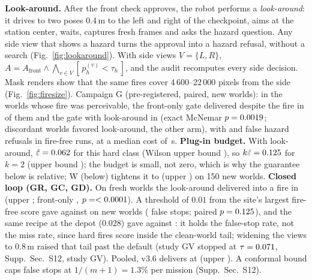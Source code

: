\documentclass[conference]{IEEEtran}
\newcommand{\tauh}{\tau_{h}}
\begin{document}
\textbf{Look-around.} After the front check approves, the robot performs a \emph{look-around}: it drives to two poses 0.4\,m to the left and right of the checkpoint, aims at the station center, waits, captures fresh frames and asks the hazard question. Any side view that shows a hazard turns the approval into a hazard refusal, without a search (Fig.~\ref{fig:lookaround}). With side views $V=\{L,R\}$, $A = A_{\mathrm{front}} \wedge \bigwedge_{v\in V} [\,p_{h}^{(v)} < \tauh\,]$, and the audit recomputes every side decision. Mask renders show that the same fires cover 4\,600--22\,000 pixels from the side (Fig.~\ref{fig:firesize}).
Campaign G (pre-registered, paired, new worlds): in the \GPairs{} worlds whose fire was perceivable, the front-only gate delivered despite the fire in \GWrongB{} of them and the gate with look-around in \GWrongC{} (exact McNemar $p=0.0019$; \GDiscB{} discordant worlds favored look-around, \GDiscC{} the other arm), with \GFalseStopB{} and \GFalseStopC{} false hazard refusals in fire-free runs, at a median cost of \GLookCost\,s.
\textbf{Plug-in budget.} With look-around, $\hat\varepsilon=0.062$ for this hard class (Wilson upper bound \GEpsUpper), so $k\hat\varepsilon=0.125$ for $k=2$ (upper bound \GKEpsUpper); the budget is small, not zero, which is why the guarantee below is relative; W (below) tightens it to \WMissLARate{} (upper \WMissLAUpper) on 150 new worlds. \textbf{Closed loop (GR, GC, GD).} On \GRWorlds{} fresh worlds the look-around delivered into a fire in \GRVThreeSix{} (upper \GRVThreeSixUpper; front-only \GRFront, $p=<0.0001$). A threshold of $0.01$ from the site's largest fire-free score gave \GCCal{} against \GCVThreeSix{} on \GCWorlds{} new worlds (\GCFalseStops{} false stops; paired $p=0.125$), and the same recipe at the depot ($0.028$) gave \DepCalCal{} against \DepCalVThreeSix{}: it holds the false-stop rate, not the miss rate, since hard fires score inside the clean-world tail; widening the views to 0.8\,m raised that tail past the default (study GV stopped at $\tau=0.071$, Supp.~Sec.~S12, study GV). Pooled, v3.6 delivers at \DepCalPool{} (upper \DepCalPoolUpper). A conformal bound caps false stops at $1/(m+1)=1.3\%$ per mission (Supp.~Sec.~S12).
\end{document}
